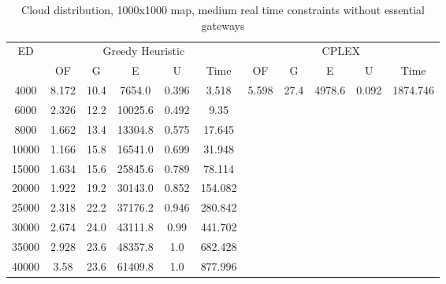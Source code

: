 \begin{table}[htb]
	\centering
	\begin{tabular}{|c|c|c|c|c|c|c|c|c|c|c|}
		\hline
		\multirow{2}{*}{ED} & \multicolumn{5}{c|}{Greedy Heuristic} & \multicolumn{5}{c|}{CPLEX}\\ 
		\cline{2-11}
& OF & G & E & U & Time & OF & G & E & U & Time\\ 
		\hline
		4000 & 8.172 & 10.4 & 7654.0 & 0.396 & 3.518 & 5.598 & 27.4 & 4978.6 & 0.092 & 1874.746 \\ 
		6000 & 2.326 & 12.2 & 10025.6 & 0.492 & 9.35 & & & & &  \\ 
		8000 & 1.662 & 13.4 & 13304.8 & 0.575 & 17.645 & & & & &  \\ 
		10000 & 1.166 & 15.8 & 16541.0 & 0.699 & 31.948 & & & & &  \\ 
		15000 & 1.634 & 15.6 & 25845.6 & 0.789 & 78.114 & & & & &  \\ 
		20000 & 1.922 & 19.2 & 30143.0 & 0.852 & 154.082 & & & & &  \\ 
		25000 & 2.318 & 22.2 & 37176.2 & 0.946 & 280.842 & & & & &  \\ 
		30000 & 2.674 & 24.0 & 43111.8 & 0.99 & 441.702 & & & & &  \\ 
		35000 & 2.928 & 23.6 & 48357.8 & 1.0 & 682.428 & & & & &  \\ 
		40000 & 3.58 & 23.6 & 61409.8 & 1.0 & 877.996 & & & & &  \\ 
		\hline 
	\end{tabular} 
	\caption{Cloud distribution, 1000x1000 map, medium real time constraints without essential gateways} 
	\label{tab:cloud_medium_n_esc_1000} 
\end{table} 

